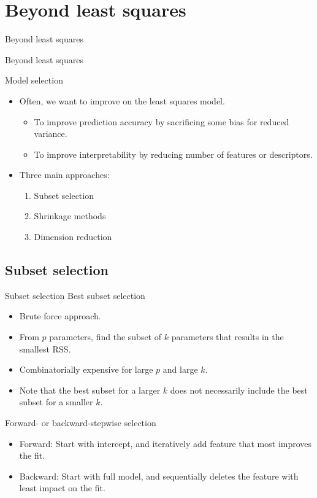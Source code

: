 \documentclass[aspectratio=169]{beamer}
\begin{document}
\section{Beyond least squares}


\begin{frame}{Beyond least squares}
    \Huge{\centerline{Beyond least squares}}
\end{frame} 

\begin{frame}{Model selection}
    \begin{itemize}
        \item Often, we want to improve on the least squares model.
        \begin{itemize}
            \item To improve prediction accuracy by sacrificing some bias for reduced variance.
            \item To improve interpretability by reducing number of features or descriptors.
        \end{itemize}
        \item Three main approaches:
        \begin{enumerate}
            \item Subset selection
            \item Shrinkage methods
            \item Dimension reduction
        \end{enumerate}
    \end{itemize}
\end{frame}


\subsection{Subset selection}

\begin{frame}{Subset selection}
    Best subset selection
    \begin{itemize}
        \item Brute force approach.
        \item From $p$ parameters, find the subset of $k$ parameters that results in the smallest RSS.
        \item Combinatorially expensive for large $p$ and large $k$.
        \item Note that the best subset for a larger $k$ does not necessarily include the best subset for a smaller $k$.
    \end{itemize}
    Forward- or backward-stepwise selection
    \begin{itemize}
        \item Forward: Start with intercept, and iteratively add feature that most improves the fit.
        \item Backward: Start with full model, and sequentially deletes the feature with least impact on the fit.
    \end{itemize}
\end{frame} 
\end{document}
